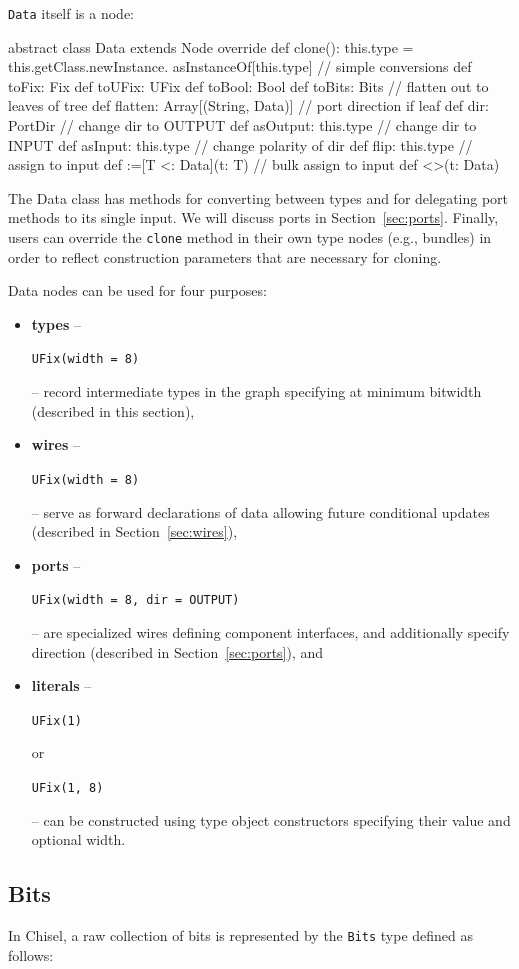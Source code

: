 \documentclass[10pt,twocolumn]{article}
\newcommand{\kode}[1]{\begin{footnotesize}{\tt #1}\end{footnotesize}}
\def\code#1{{\small\tt #1}}
\begin{document}
\code{Data} itself is a node:
\begin{scala}
abstract class Data extends Node {
  override def clone(): this.type =
    this.getClass.newInstance.
      asInstanceOf[this.type]
  // simple conversions
  def toFix: Fix
  def toUFix: UFix
  def toBool: Bool
  def toBits: Bits
  // flatten out to leaves of tree
  def flatten: Array[(String, Data)]
  // port direction if leaf
  def dir: PortDir
  // change dir to OUTPUT
  def asOutput: this.type
  // change dir to INPUT
  def asInput: this.type
  // change polarity of dir
  def flip: this.type
  // assign to input
  def :=[T <: Data](t: T)
  // bulk assign to input
  def <>(t: Data)
}
\end{scala}
\noindent
The Data class has methods for converting between types and for
delegating port methods to its single input.  We will discuss ports in
Section~\ref{sec:ports}.  Finally, users can override the \code{clone}
method in their own type nodes (e.g., bundles) in order to reflect
construction parameters that are necessary for cloning.

Data nodes can be used for four purposes:

\begin{itemize}
\item {\bf types} -- \kode{UFix(width = 8)} -- record intermediate types in the graph
  specifying at minimum bitwidth (described in this section), 
\item {\bf wires} -- \kode{UFix(width = 8)} -- serve as forward declarations of data allowing future
  conditional updates (described in Section~\ref{sec:wires}), 
\item {\bf ports} -- \kode{UFix(width = 8, dir = OUTPUT)} -- are
  specialized wires defining component interfaces, and
  additionally specify direction (described in
  Section~\ref{sec:ports}), and
\item{\bf literals} -- \kode{UFix(1)} or \kode{UFix(1, 8)} -- can be constructed using type object
constructors specifying their value and optional width.
\end{itemize}

\subsection{Bits}

In Chisel, a raw collection of bits is represented by the \code{Bits}
type defined as follows:
\end{document}

